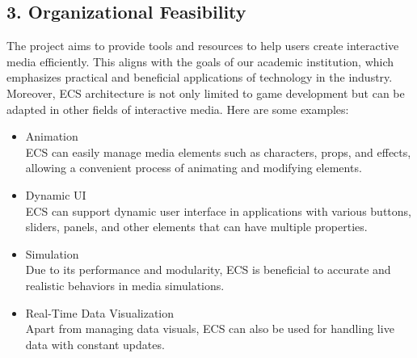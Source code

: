 \subsection*{3. Organizational Feasibility}
The project aims to provide tools and resources to help users create interactive media efficiently.
This aligns with the goals of our academic institution, which emphasizes practical and beneficial applications of technology in the industry.
Moreover, ECS architecture is not only limited to game development but can be adapted in other fields of interactive media.
Here are some examples:
\begin{itemize}
    \item Animation\\
    ECS can easily manage media elements such as characters, props, and effects, allowing a convenient process of animating and modifying elements.
    \item Dynamic UI\\
    ECS can support dynamic user interface in applications with various buttons, sliders, panels, and other elements that can have multiple properties.
    \item Simulation\\
    Due to its performance and modularity, ECS is beneficial to accurate and realistic behaviors in media simulations.
    \item Real-Time Data Visualization\\
    Apart from managing data visuals, ECS can also be used for handling live data with constant updates.
\end{itemize}